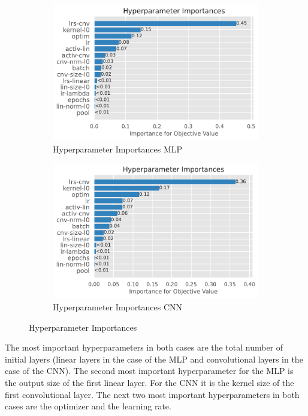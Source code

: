 \documentclass[runningheads]{llncs}
\begin{document}
\begin{figure}[h]
     \centering
     \begin{subfigure}[b]{0.49\textwidth}
         \centering
         \includegraphics[width=\textwidth]{images/hyper_importances_mlp.pdf}
         \caption{Hyperparameter Importances MLP}
     \end{subfigure}
     \hfill
     \begin{subfigure}[b]{0.49\textwidth}
        \centering
        \includegraphics[width=\textwidth]{images/hyper_importances_cnn.pdf}
        \caption{Hyperparameter Importances CNN}
    \end{subfigure}
    \caption{Hyperparameter Importances}
    \label{fig:hyperparam-importances-fcn-cnn}
\end{figure}

The most important hyperparameters in both cases are the total number of initial layers (linear layers in the case of the MLP and convolutional layers in the case of the CNN). The second most important hyperparameter for the MLP is the output size of the first linear layer. For the CNN it is the kernel size of the first convolutional layer. The next two most important hyperparameters in both cases are the optimizer and the learning rate. 
\end{document}

